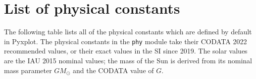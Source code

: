 %
%
%
%
%



\chapter{List of physical constants}
\label{ch:constants}

The following table lists all of the physical constants which are defined by default in Pyxplot. The
physical constants in the {\tt phy} module take their CODATA 2022 recommended values, or their exact values in the SI
since 2019. The solar values are the IAU 2015 nominal values; the mass of the Sun is derived from its nominal mass
parameter $GM_\odot$ and the CODATA value of $G$.

